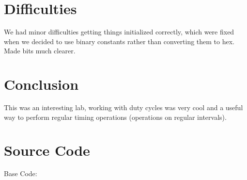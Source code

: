 \documentclass[12pt,letterpaper]{article}
\begin{document}
\section{Difficulties}
We had minor difficulties getting things initialized correctly, which were fixed when we decided to use binary constants rather than converting them to hex. Made bits much clearer.

\section{Conclusion}
This was an interesting lab, working with duty cycles was very cool and a useful way to perform regular timing operations (operations on regular intervals). 

\section{Source Code}
Base Code:
\end{document}
